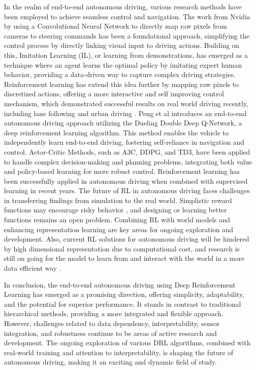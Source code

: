 In the realm of end-to-end autonomous driving, various research methods have been employed to achieve seamless control and navigation. The work from Nvidia by using a Convolutional Neural Network to directly map raw pixels from cameras to steering commands has been a foundational approach, simplifying the control process by directly linking visual input to driving actions. Building on this, Imitation Learning (IL), or learning from demonstrations, has emerged as a technique where an agent learns the optimal policy by imitating expert human behavior, providing a data-driven way to capture complex driving strategies. Reinforcement learning has extend this idea further by mapping raw pixels to discretized actions, offering a more interactive and self improving control mechanism, which demonstrated successful results on real world driving recently, including lane following \parencite{kendall2019learning} and urban driving \parencite{jaritz2018end}. Peng et al \parencite{peng2021end} introduces an end-to-end autonomous driving approach utilizing the Dueling Double Deep Q-Network, a deep reinforcement learning algorithm. This method enables the vehicle to independently learn end-to-end driving, fostering self-reliance in navigation and control. Actor-Critic Methods, such as A3C, DDPG, and TD3, have been applied to handle complex decision-making and planning problems, integrating both value and policy-based learning for more robust control. Reinforcement learning has been successfully applied in autonomous driving when combined with supervised learning in recent years. The future of RL in autonomous driving faces challenges in transferring findings from simulation to the real world. Simplistic reward functions may encourage risky behavior \parencite{knox2023reward}, and designing or learning better functions remains an open problem. Combining RL with world models and enhancing representation learning are key areas for ongoing exploration and development. Also, current RL solutions for autonomous driving will be hindered by high dimensional representation due to computational cost, and research is still on going for the model to learn from and interact with the world in a more data efficient way \parencite{chen2023end}.

In conclusion, the end-to-end autonomous driving using Deep Reinforcement Learning has emerged as a promising direction, offering simplicity, adaptability, and the potential for superior performance. It stands in contrast to traditional hierarchical methods, providing a more integrated and flexible approach. However, challenges related to data dependency, interpretability, sensor integration, and robustness continue to be areas of active research and development. The ongoing exploration of various DRL algorithms, combined with real-world training and attention to interpretability, is shaping the future of autonomous driving, making it an exciting and dynamic field of study.

